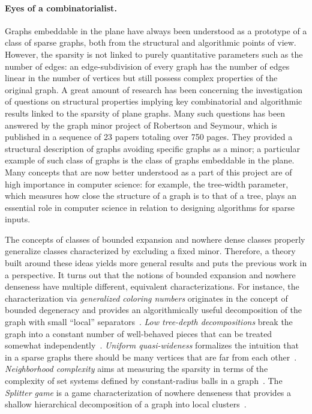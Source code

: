 \paragraph*{Eyes of a combinatorialist.}
Graphs embeddable in the plane have always been understood as a prototype of a class of sparse graphs,
both from the structural and algorithmic points of view.
However, the sparsity is not linked to purely quantitative parameters such as the number of edges:
an edge-subdivision of every graph has the number of edges linear in the number of vertices
but still possess complex properties of the original graph.
A great amount of research has been concerning the investigation of questions on structural properties
implying key combinatorial and algorithmic results linked to the sparsity of plane graphs.
Many such questions has been answered by the graph minor project of Robertson and Seymour,
which is published in a sequence of 23 papers totaling over 750 pages.
They provided a structural description of graphs avoiding specific graphs as a minor;
a particular example of such class of graphs is the class of graphs embeddable in the plane.
Many concepts that are now better understood as a part of this project are of high importance in computer science:
for example, the tree-width parameter, which measures how close the structure of a graph is to that of a tree,
plays an essential role in computer science in relation to designing algorithms for sparse inputs.

The concepts of classes of bounded expansion and nowhere dense classes properly generalize classes characterized by excluding a fixed minor.
Therefore, a theory built around these ideas yields more general results and puts the previous work in a perspective.
It turns out that the notions of bounded expansion and nowhere denseness have multiple different, equivalent characterizations.
For instance, the characterization via {\em{generalized coloring numbers}} originates in the concept of bounded degeneracy and provides an algorithmically useful decomposition of the graph with small ``local''
separators~\cite{Zhu09}.
{\em{Low tree-depth decompositions}} break the graph into a constant number of well-behaved pieces that can be treated somewhat independently~\cite{NesetrilM08a}.
{\em{Uniform quasi-wideness}} formalizes the intuition that in a sparse graphs there should be many vertices that are far from each other~\cite{nevsetvril2010first}.
{\em{Neighborhood complexity}} aims at measuring the sparsity in terms of the complexity of set systems defined by constant-radius balls in a graph~\cite{ReidlVS19}.
The {\em{Splitter game}} is a game characterization of nowhere denseness that provides a shallow hierarchical decomposition of a graph into local clusters~\cite{grohe2017deciding}.

